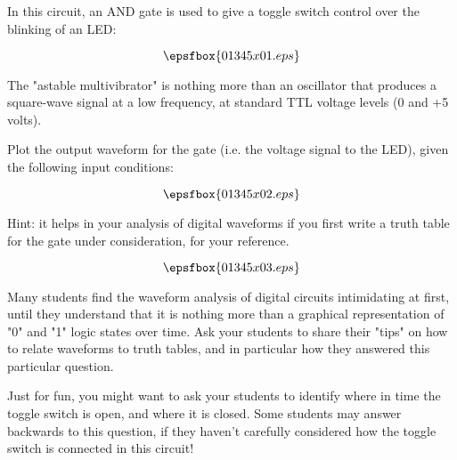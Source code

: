 

In this circuit, an AND gate is used to give a toggle switch control over the blinking of an LED:

$$\epsfbox{01345x01.eps}$$

The "astable multivibrator" is nothing more than an oscillator that produces a square-wave signal at a low frequency, at standard TTL voltage levels (0 and +5 volts).

Plot the output waveform for the gate (i.e. the voltage signal to the LED), given the following input conditions:

$$\epsfbox{01345x02.eps}$$

Hint: it helps in your analysis of digital waveforms if you first write a truth table for the gate under consideration, for your reference.







$$\epsfbox{01345x03.eps}$$







Many students find the waveform analysis of digital circuits intimidating at first, until they understand that it is nothing more than a graphical representation of "0" and "1" logic states over time.  Ask your students to share their "tips" on how to relate waveforms to truth tables, and in particular how they answered this particular question.

Just for fun, you might want to ask your students to identify where in time the toggle switch is open, and where it is closed.  Some students may answer backwards to this question, if they haven't carefully considered how the toggle switch is connected in this circuit!



